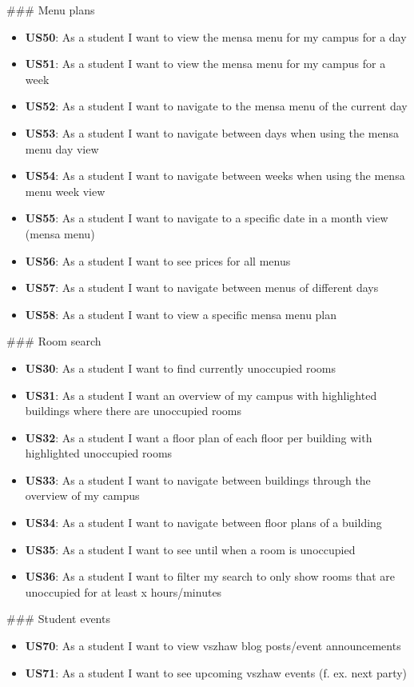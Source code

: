 \begin{markdown}
\newpage

### Menu plans

\begin{itemize}
  \item \textbf{US50}: As a student I want to view the mensa menu for my campus for a day
  \item \textbf{US51}: As a student I want to view the mensa menu for my campus for a week
  \item \textbf{US52}: As a student I want to navigate to the mensa menu of the current day
  \item \textbf{US53}: As a student I want to navigate between days when using the mensa menu day view
  \item \textbf{US54}: As a student I want to navigate between weeks when using the mensa menu week view
  \item \textbf{US55}: As a student I want to navigate to a specific date in a month view (mensa menu)
  \item \textbf{US56}: As a student I want to see prices for all menus
  \item \textbf{US57}: As a student I want to navigate between menus of different days
  \item \textbf{US58}: As a student I want to view a specific mensa menu plan
\end{itemize}

### Room search

\begin{itemize}
  \item \textbf{US30}: As a student I want to find currently unoccupied rooms
  \item \textbf{US31}: As a student I want an overview of my campus with highlighted buildings where there are unoccupied rooms
  \item \textbf{US32}: As a student I want a floor plan of each floor per building with highlighted unoccupied rooms
  \item \textbf{US33}: As a student I want to navigate between buildings through the overview of my campus
  \item \textbf{US34}: As a student I want to navigate between floor plans of a building
  \item \textbf{US35}: As a student I want to see until when a room is unoccupied
  \item \textbf{US36}: As a student I want to filter my search to only show rooms that are unoccupied for at least x hours/minutes
\end{itemize}

### Student events

\begin{itemize}
  \item \textbf{US70}: As a student I want to view vszhaw blog posts/event announcements
  \item \textbf{US71}: As a student I want to see upcoming vszhaw events (f. ex. next party)
\end{itemize}

\end{markdown}
